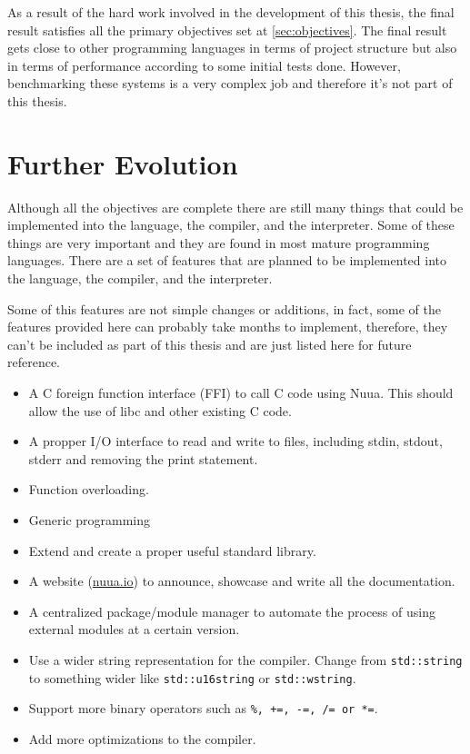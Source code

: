 As a result of the hard work involved in the development of this thesis, the final result satisfies all the primary objectives set at \autoref{sec:objectives}.
The final result gets close to other programming languages in terms of project structure but also in terms of performance according to some initial
tests done. However, benchmarking these systems is a very complex job and therefore it's not part of this thesis.

\section{Further Evolution}
\label{sec:forthcoming}

Although all the objectives are complete there are still many things that could be implemented into the language, the compiler, and the interpreter.
Some of these things are very important and they are found in most mature programming languages. There are a set of features that are planned to be
implemented into the language, the compiler, and the interpreter.

Some of this features are not simple changes or additions, in fact, some of the features provided here can probably take months to implement,
therefore, they can't be included as part of this thesis and are just listed here for future reference.

\begin{itemize}
    \item A C foreign function interface (FFI) to call C code using Nuua. This should allow the use of libc and other existing C code.
    \item A propper I/O interface to read and write to files, including stdin, stdout, stderr and removing the print statement.
    \item Function overloading.
    \item Generic programming
    \item Extend and create a proper useful standard library.
    \item A website (\href{https://nuua.io}{nuua.io}) to announce, showcase and write all the documentation.
    \item A centralized package/module manager to automate the process of using external modules at a certain version.
    \item Use a wider string representation for the compiler. Change from \texttt{std::string} to something wider like
        \texttt{std::u16string} or \texttt{std::wstring}.
    \item Support more binary operators such as \texttt{\%, +=, -=, /= or *=}.
    \item Add more optimizations to the compiler.
\end{itemize}

